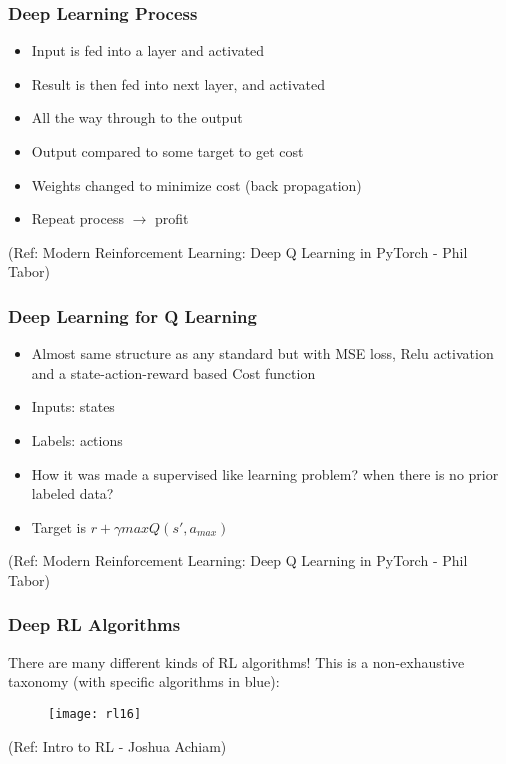 \begin{frame}[fragile]\frametitle{Deep Learning Process}


\begin{itemize}
\item Input is fed into a layer and activated 
\item Result is then fed into next layer, and activated 
\item All the way through to the output
\item Output compared to some target to get cost 
\item  Weights changed to minimize cost (back propagation)
\item Repeat process $\rightarrow$ profit
\end{itemize}

{\tiny (Ref: Modern Reinforcement Learning: Deep Q Learning in PyTorch - Phil Tabor)}

\end{frame}

\begin{frame}[fragile]\frametitle{Deep Learning for Q Learning}


\begin{itemize}
\item Almost same structure as any standard but with MSE loss, Relu activation and a state-action-reward based Cost function
\item Inputs: states
\item Labels: actions
\item How it was made a supervised like learning problem? when there is no prior labeled data?
\item Target is $r + \gamma max Q(s',a_{max})$
\end{itemize}

{\tiny (Ref: Modern Reinforcement Learning: Deep Q Learning in PyTorch - Phil Tabor)}

\end{frame}

\begin{frame}[fragile]\frametitle{Deep RL Algorithms}

There are many different kinds of RL algorithms! This is a non-exhaustive taxonomy (with specific algorithms in blue):
\begin{figure}
\centering
\texttt{[image: rl16]}
\end{figure}

{\tiny (Ref: Intro to RL - Joshua Achiam)}


\end{frame}

